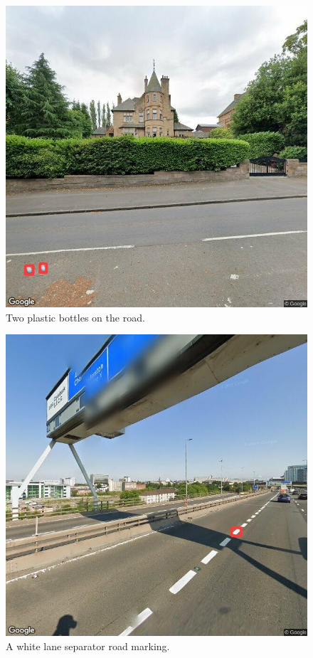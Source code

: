 \documentclass{thesis}
\begin{document}
\begin{appendices}
\begin{figure}[h!]
    \centering
    \includegraphics[scale=0.375]{images/good-two-bottles.jpg}
    \caption{Two plastic bottles on the road.}
\end{figure}

\begin{figure}[h]
    \centering
    \includegraphics[scale=0.45]{images/flaw-road-marking.jpg}
    \caption{A white lane separator road marking.}
\end{figure}


\end{appendices}
\end{document}
